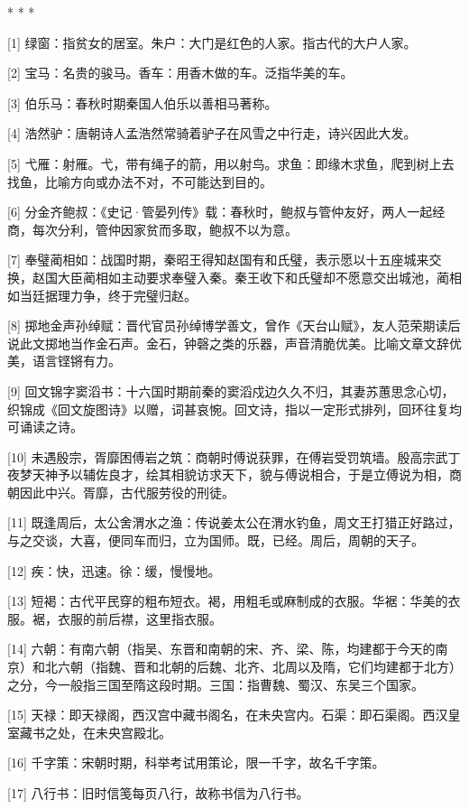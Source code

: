 \documentclass[12pt,UTF8]{ctexbook}
\begin{document}
* * *



[1] 绿窗：指贫女的居室。朱户：大门是红色的人家。指古代的大户人家。

[2] 宝马：名贵的骏马。香车：用香木做的车。泛指华美的车。

[3] 伯乐马：春秋时期秦国人伯乐以善相马著称。

[4] 浩然驴：唐朝诗人孟浩然常骑着驴子在风雪之中行走，诗兴因此大发。

[5] 弋雁：射雁。弋，带有绳子的箭，用以射鸟。求鱼：即缘木求鱼，爬到树上去找鱼，比喻方向或办法不对，不可能达到目的。

[6] 分金齐鲍叔：《史记·管晏列传》载：春秋时，鲍叔与管仲友好，两人一起经商，每次分利，管仲因家贫而多取，鲍叔不以为意。

[7] 奉璧蔺相如：战国时期，秦昭王得知赵国有和氏璧，表示愿以十五座城来交换，赵国大臣蔺相如主动要求奉璧入秦。秦王收下和氏璧却不愿意交出城池，蔺相如当廷据理力争，终于完璧归赵。

[8] 掷地金声孙绰赋：晋代官员孙绰博学善文，曾作《天台山赋》，友人范荣期读后说此文掷地当作金石声。金石，钟磬之类的乐器，声音清脆优美。比喻文章文辞优美，语言铿锵有力。

[9] 回文锦字窦滔书：十六国时期前秦的窦滔戍边久久不归，其妻苏蕙思念心切，织锦成《回文旋图诗》以赠，词甚哀惋。回文诗，指以一定形式排列，回环往复均可诵读之诗。

[10] 未遇殷宗，胥靡困傅岩之筑：商朝时傅说获罪，在傅岩受罚筑墙。殷高宗武丁夜梦天神予以辅佐良才，绘其相貌访求天下，貌与傅说相合，于是立傅说为相，商朝因此中兴。胥靡，古代服劳役的刑徒。

[11] 既逢周后，太公舍渭水之渔：传说姜太公在渭水钓鱼，周文王打猎正好路过，与之交谈，大喜，便同车而归，立为国师。既，已经。周后，周朝的天子。

[12] 疾：快，迅速。徐：缓，慢慢地。

[13] 短褐：古代平民穿的粗布短衣。褐，用粗毛或麻制成的衣服。华裾：华美的衣服。裾，衣服的前后襟，这里指衣服。

[14] 六朝：有南六朝（指吴、东晋和南朝的宋、齐、梁、陈，均建都于今天的南京）和北六朝（指魏、晋和北朝的后魏、北齐、北周以及隋，它们均建都于北方）之分，今一般指三国至隋这段时期。三国：指曹魏、蜀汉、东吴三个国家。

[15] 天禄：即天禄阁，西汉宫中藏书阁名，在未央宫内。石渠：即石渠阁。西汉皇室藏书之处，在未央宫殿北。

[16] 千字策：宋朝时期，科举考试用策论，限一千字，故名千字策。

[17] 八行书：旧时信笺每页八行，故称书信为八行书。
\end{document}
